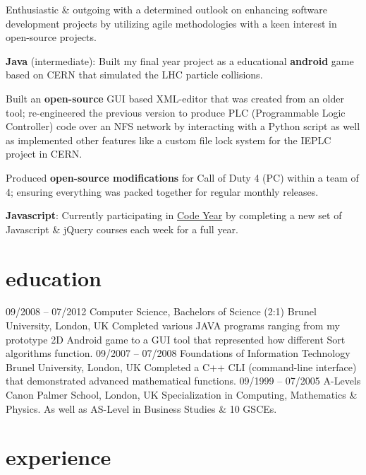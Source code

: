 \documentclass[]{friggeri-cv}
\begin{document}
Enthusiastic \& outgoing with a determined outlook on enhancing software development projects by utilizing agile methodologies with a keen interest in open-source projects.

\textbf{Java} (intermediate): Built my final year project as a educational \textbf{android} game based on CERN that simulated the LHC particle collisions.

Built an \textbf{open-source} GUI based XML-editor that was created from an older tool; re-engineered the previous version to produce PLC (Programmable Logic Controller) code over an NFS network by interacting with a Python script as well as implemented other features like a custom file lock system for the IEPLC project in CERN.

Produced \textbf{open-source modifications} for Call of Duty 4 (PC) within a team of 4; ensuring everything was packed together for regular monthly releases.

\textbf{Javascript}: Currently participating in \href{http://codeyear.com}{Code Year} by completing a new set of Javascript \& jQuery courses each week for a full year.


\section{education}

\begin{entrylist}
  \entry
    {09/2008 – 07/2012}
    {Computer Science, Bachelors of Science (2:1)}
    {Brunel University, London, UK}
    {Completed various JAVA programs ranging from my prototype 2D Android game to a GUI tool that represented how different Sort algorithms function.}
  \entry
    {09/2007 – 07/2008}
    {Foundations of Information Technology}
    {Brunel University, London, UK}
    {Completed a C++ CLI (command-line interface) that demonstrated advanced mathematical functions.}
  \entry
    {09/1999 – 07/2005}
    {A-Levels}
    {Canon Palmer School, London, UK}
    {Specialization in Computing, Mathematics \& Physics. As well as AS-Level in Business Studies \& 10 GSCEs.}
\end{entrylist}

\section{experience}
\end{document}
